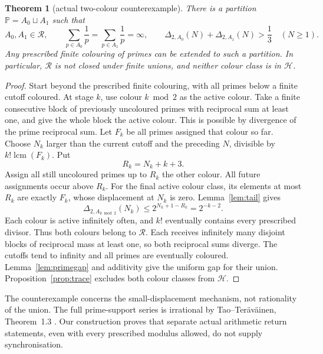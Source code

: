 \documentclass[11pt,a4paper]{article}
\newtheorem{theorem}{Theorem}[section]
\theoremstyle{definition}\newtheorem{definition}[theorem]{Definition}
\theoremstyle{remark}\newtheorem{remark}[theorem]{Remark}
\newcommand{\PP}{\mathbb P}\newcommand{\RR}{\mathcal R}\newcommand{\HH}{\mathcal H}\newcommand{\WW}{\mathcal W}\newcommand{\VV}{\mathcal V}\newcommand{\EE}{\mathbb E}\newcommand{\LL}{\mathcal L}
\DeclareMathOperator{\lcm}{lcm}
\begin{document}
\begin{theorem}[actual two-colour counterexample]\label{thm:partition}
There is a partition $\PP=A_0\sqcup A_1$ such that
\[
 A_0,A_1\in\RR,\qquad
 \sum_{p\in A_0}\frac1p=\sum_{p\in A_1}\frac1p=\infty,
 \qquad
 \Delta_{2,A_0}(N)+\Delta_{2,A_1}(N)>\frac13\quad(N\ge1).
\]
Any prescribed finite colouring of primes can be extended to such a partition. In particular, $\RR$ is not closed under finite unions, and neither colour class is in $\HH$.
\end{theorem}
\begin{proof}
Start beyond the prescribed finite colouring, with all primes below a finite cutoff coloured. At stage $k$, use colour $k\bmod2$ as the active colour. Take a finite consecutive block of previously uncoloured primes with reciprocal sum at least one, and give the whole block the active colour. This is possible by divergence of the prime reciprocal sum.
Let $F_k$ be all primes assigned that colour so far. Choose $N_k$ larger than the current cutoff and the preceding $N$, divisible by $k!\lcm(F_k)$. Put
\[
 R_k=N_k+k+3.
\]
Assign all still uncoloured primes up to $R_k$ the other colour. All future assignments occur above $R_k$.
For the final active colour class, its elements at most $R_k$ are exactly $F_k$, whose displacement at $N_k$ is zero. Lemma~\ref{lem:tail} gives
\[
 \Delta_{2,A_{k\bmod2}}(N_k)\le2^{N_k+1-R_k}=2^{-k-2}.
\]
Each colour is active infinitely often, and $k!$ eventually contains every prescribed divisor. Thus both colours belong to $\RR$.
Each receives infinitely many disjoint blocks of reciprocal mass at least one, so both reciprocal sums diverge. The cutoffs tend to infinity and all primes are eventually coloured.
Lemma~\ref{lem:primegap} and additivity give the uniform gap for their union. Proposition~\ref{prop:trace} excludes both colour classes from $\HH$.
\end{proof}
The counterexample concerns the small-displacement mechanism, not rationality of the union. The full prime-support series is irrational by Tao--Ter\"av\"ainen, Theorem~1.3 \cite{tt}. Our construction proves that separate actual arithmetic return statements, even with every prescribed modulus allowed, do not supply synchronisation.
\end{document}
